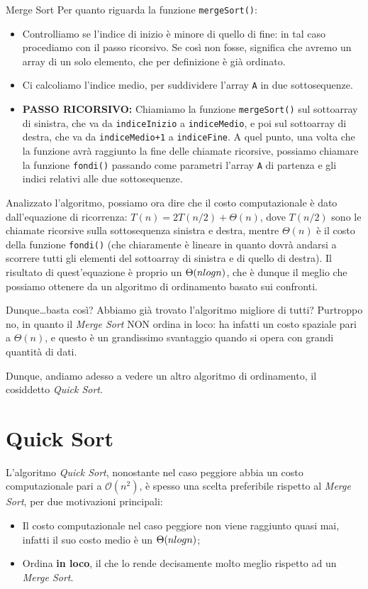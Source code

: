 \documentclass[12pt]{report}
\begin{document}
\begin{algoritmo}{Merge Sort}{}
    	Per quanto riguarda la funzione \texttt{mergeSort()}:
    	\begin{itemize}
    		\item Controlliamo se l'indice di inizio è minore di quello di fine: in tal caso procediamo con il passo ricorsivo. Se così non fosse, significa che avremo un array di un solo elemento, che per definizione è già ordinato.
    		\item Ci calcoliamo l'indice medio, per suddividere l'array \texttt{A} in due sottosequenze.
    		\item \textbf{PASSO RICORSIVO:} Chiamiamo la funzione \texttt{mergeSort()} sul sottoarray di sinistra, che va da \texttt{indiceInizio} a \texttt{indiceMedio}, e poi sul sottoarray di destra, che va da \texttt{indiceMedio+1} a \texttt{indiceFine}. A quel punto, una volta che la funzione avrà raggiunto la fine delle chiamate ricorsive, possiamo chiamare la funzione \texttt{fondi()} passando come parametri l'array \texttt{A} di partenza e gli indici relativi alle due sottosequenze.
    	\end{itemize}
    \end{algoritmo}
    
    Analizzato l'algoritmo, possiamo ora dire che il costo computazionale è dato dall'equazione di ricorrenza: $T(n) = 2T(n/2) + \Theta(n)$, dove $T(n/2)$ sono le chiamate ricorsive sulla sottosequenza sinistra e destra, mentre $\Theta(n)$ è il costo della funzione \texttt{fondi()} (che chiaramente è lineare in quanto dovrà andarsi a scorrere tutti gli elementi del sottoarray di sinistra e di quello di destra). Il risultato di quest'equazione è proprio un $\Theta(n \\log n)$, che è dunque il meglio che possiamo ottenere da un algoritmo di ordinamento basato sui confronti.
    
    Dunque\dots basta così? Abbiamo già trovato l'algoritmo migliore di tutti?
    Purtroppo no, in quanto il \textit{Merge Sort} NON ordina in loco: ha infatti un costo spaziale pari a $\Theta(n)$, e questo è un grandissimo svantaggio quando si opera con grandi quantità di dati.
    
    Dunque, andiamo adesso a vedere un altro algoritmo di ordinamento, il cosiddetto \textit{Quick Sort}.
    
    \section{Quick Sort}
    L'algoritmo \textit{Quick Sort}, nonostante nel caso peggiore abbia un costo computazionale pari a $\mathcal{O}(n^2)$, è spesso una scelta preferibile rispetto al \textit{Merge Sort}, per due motivazioni principali:
    \begin{itemize}
    	\item Il costo computazionale nel caso peggiore non viene raggiunto quasi mai, infatti il suo costo medio è un $\Theta(n \\log n)$;
    	\item Ordina \textbf{in loco}, il che lo rende decisamente molto meglio rispetto ad un \textit{Merge Sort}.
    \end{itemize}
    
\end{document}
